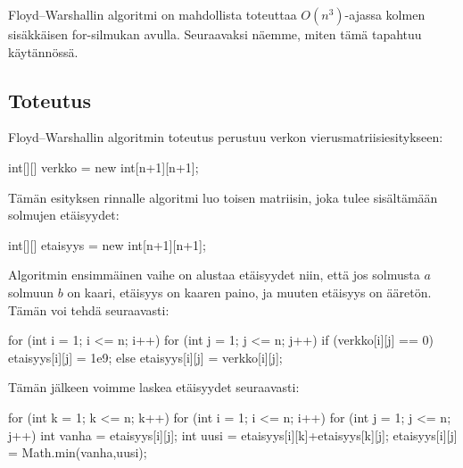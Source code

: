 Floyd–Warshallin algoritmi on mahdollista toteuttaa
$O(n^3)$-ajassa kolmen sisäkkäisen for-silmukan avulla.
Seuraavaksi näemme, miten tämä tapahtuu käytännössä.

\subsection{Toteutus}

Floyd–Warshallin algoritmin toteutus perustuu verkon
vierusmatriisiesitykseen:

\begin{code}
int[][] verkko = new int[n+1][n+1];
\end{code}

Tämän esityksen rinnalle algoritmi luo toisen matriisin,
joka tulee sisältä\-mään solmujen etäisyydet:

\begin{code}
int[][] etaisyys = new int[n+1][n+1];
\end{code}

Algoritmin ensimmäinen vaihe on alustaa etäisyydet niin,
että jos solmusta $a$ solmuun $b$ on kaari,
etäisyys on kaaren paino, ja muuten etäisyys on ääretön.
Tämän voi tehdä seuraavasti:

\begin{code}
for (int i = 1; i <= n; i++) {
    for (int j = 1; j <= n; j++) {
        if (verkko[i][j] == 0) {
            etaisyys[i][j] = 1e9;
        } else {
            etaisyys[i][j] = verkko[i][j];
        }
    }
}
\end{code}

Tämän jälkeen voimme laskea etäisyydet seuraavasti:

\begin{code}
for (int k = 1; k <= n; k++) {
    for (int i = 1; i <= n; i++) {
        for (int j = 1; j <= n; j++) {
            int vanha = etaisyys[i][j];
            int uusi = etaisyys[i][k]+etaisyys[k][j];
            etaisyys[i][j] = Math.min(vanha,uusi);
        }
    }
}
\end{code}